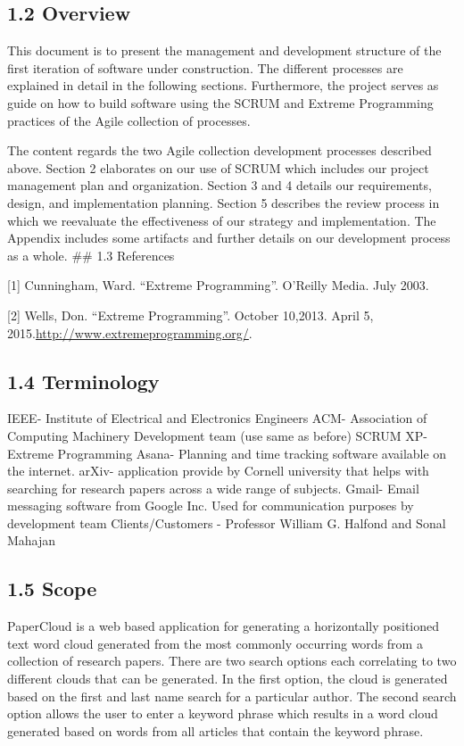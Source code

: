 \documentclass[]{article}
\begin{document}
\subsection{1.2 Overview}\label{overview}

This document is to present the management and development structure of
the first iteration of software under construction. The different
processes are explained in detail in the following sections.
Furthermore, the project serves as guide on how to build software using
the SCRUM and Extreme Programming practices of the Agile collection of
processes.

The content regards the two Agile collection development processes
described above. Section 2 elaborates on our use of SCRUM which includes
our project management plan and organization. Section 3 and 4 details
our requirements, design, and implementation planning. Section 5
describes the review process in which we reevaluate the effectiveness of
our strategy and implementation. The Appendix includes some artifacts
and further details on our development process as a whole. \#\# 1.3
References

{[}1{]} Cunningham, Ward. ``Extreme Programming''. O'Reilly Media. July
2003.

{[}2{]} Wells, Don. ``Extreme Programming''. October 10,2013. April 5,
2015.\url{http://www.extremeprogramming.org/}.

\subsection{1.4 Terminology}\label{terminology}

IEEE- Institute of Electrical and Electronics Engineers ACM- Association
of Computing Machinery Development team (use same as before) SCRUM XP-
Extreme Programming Asana- Planning and time tracking software available
on the internet. arXiv- application provide by Cornell university that
helps with searching for research papers across a wide range of
subjects. Gmail- Email messaging software from Google Inc. Used for
communication purposes by development team Clients/Customers - Professor
William G. Halfond and Sonal Mahajan

\subsection{1.5 Scope}\label{scope}

PaperCloud is a web based application for generating a horizontally
positioned text word cloud generated from the most commonly occurring
words from a collection of research papers. There are two search options
each correlating to two different clouds that can be generated. In the
first option, the cloud is generated based on the first and last name
search for a particular author. The second search option allows the user
to enter a keyword phrase which results in a word cloud generated based
on words from all articles that contain the keyword phrase.
\end{document}
